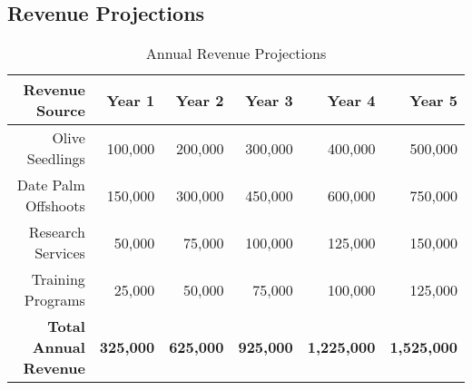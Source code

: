 \subsection{Revenue Projections}

\begin{table}[h]
\centering
\begin{tabular}{|r|r|r|r|r|r|}
\hline
\textbf{Revenue Source} & \textbf{Year 1} & \textbf{Year 2} & \textbf{Year 3} & \textbf{Year 4} & \textbf{Year 5} \\
\hline
Olive Seedlings & 100,000 & 200,000 & 300,000 & 400,000 & 500,000 \\
Date Palm Offshoots & 150,000 & 300,000 & 450,000 & 600,000 & 750,000 \\
Research Services & 50,000 & 75,000 & 100,000 & 125,000 & 150,000 \\
Training Programs & 25,000 & 50,000 & 75,000 & 100,000 & 125,000 \\
\hline
\textbf{Total Annual Revenue} & \textbf{325,000} & \textbf{625,000} & \textbf{925,000} & \textbf{1,225,000} & \textbf{1,525,000} \\
\hline
\end{tabular}
\caption{Annual Revenue Projections}
\end{table}

